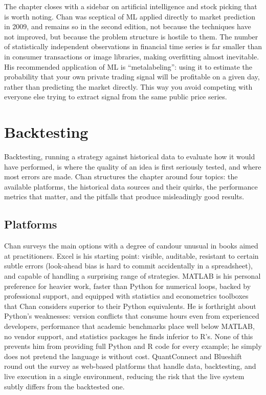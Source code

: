 \documentclass[12pt, a4paper]{article}
\begin{document}
The chapter closes with a sidebar on artificial intelligence and stock picking that is worth noting. Chan was sceptical of ML applied directly to market prediction in 2009, and remains so in the second edition, not because the techniques have not improved, but because the problem structure is hostile to them. The number of statistically independent observations in financial time series is far smaller than in consumer transactions or image libraries, making overfitting almost inevitable. His recommended application of ML is ``metalabeling'': using it to estimate the probability that your own private trading signal will be profitable on a given day, rather than predicting the market directly. This way you avoid competing with everyone else trying to extract signal from the same public price series.


\section{Backtesting}

Backtesting, running a strategy against historical data to evaluate how it would have performed, is where the quality of an idea is first seriously tested, and where most errors are made. Chan structures the chapter around four topics: the available platforms, the historical data sources and their quirks, the performance metrics that matter, and the pitfalls that produce misleadingly good results.

\subsection*{Platforms}

Chan surveys the main options with a degree of candour unusual in books aimed at practitioners. Excel is his starting point: visible, auditable, resistant to certain subtle errors (look-ahead bias is hard to commit accidentally in a spreadsheet), and capable of handling a surprising range of strategies. MATLAB is his personal preference for heavier work, faster than Python for numerical loops, backed by professional support, and equipped with statistics and econometrics toolboxes that Chan considers superior to their Python equivalents. He is forthright about Python's weaknesses: version conflicts that consume hours even from experienced developers, performance that academic benchmarks place well below MATLAB, no vendor support, and statistics packages he finds inferior to R's. None of this prevents him from providing full Python and R code for every example; he simply does not pretend the language is without cost. QuantConnect and Blueshift round out the survey as web-based platforms that handle data, backtesting, and live execution in a single environment, reducing the risk that the live system subtly differs from the backtested one.
\end{document}
